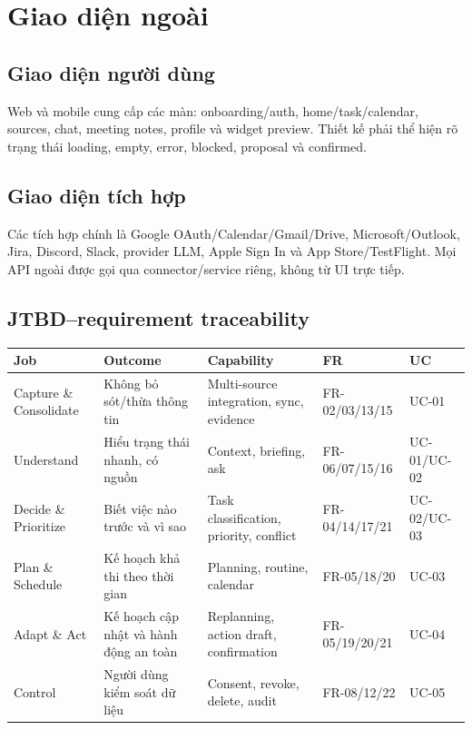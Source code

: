 \documentclass[12pt,a4paper]{article}
\begin{document}
\section{Giao diện ngoài}
\subsection{Giao diện người dùng}
Web và mobile cung cấp các màn: onboarding/auth, home/task/calendar, sources, chat, meeting notes, profile và widget preview. Thiết kế phải thể hiện rõ trạng thái loading, empty, error, blocked, proposal và confirmed.

\subsection{Giao diện tích hợp}
Các tích hợp chính là Google OAuth/Calendar/Gmail/Drive, Microsoft/Outlook, Jira, Discord, Slack, provider LLM, Apple Sign In và App Store/TestFlight. Mọi API ngoài được gọi qua connector/service riêng, không từ UI trực tiếp.

\subsection{JTBD--requirement traceability}
\begin{longtable}{p{3.1cm}p{3.1cm}p{3.7cm}p{2.3cm}p{2.3cm}}
\toprule Job & Outcome & Capability & FR & UC \\ \midrule\endhead
Capture \& Consolidate & Không bỏ sót/thừa thông tin & Multi-source integration, sync, evidence & FR-02/03/13/15 & UC-01 \\
Understand & Hiểu trạng thái nhanh, có nguồn & Context, briefing, ask & FR-06/07/15/16 & UC-01/UC-02 \\
Decide \& Prioritize & Biết việc nào trước và vì sao & Task classification, priority, conflict & FR-04/14/17/21 & UC-02/UC-03 \\
Plan \& Schedule & Kế hoạch khả thi theo thời gian & Planning, routine, calendar & FR-05/18/20 & UC-03 \\
Adapt \& Act & Kế hoạch cập nhật và hành động an toàn & Replanning, action draft, confirmation & FR-05/19/20/21 & UC-04 \\
Control & Người dùng kiểm soát dữ liệu & Consent, revoke, delete, audit & FR-08/12/22 & UC-05 \\
\bottomrule
\end{longtable}
\end{document}
